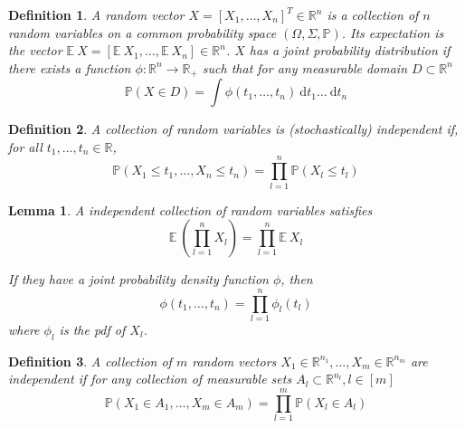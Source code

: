 \documentclass[10pt,a4paper]{article}
\theoremstyle{thmstyle}
\newtheorem{definition}{Definition}
\newtheorem{lemma}{Lemma}
\newcommand{\diff}{~\mathrm{d}}
\newcommand{\E}{\mathbb{E}~}
\renewcommand{\Pr}[1]{\mathbb{P}\left( #1 \right)}
\begin{document}
\begin{definition}
  A \emph{random vector} $X = [X_{1}, \dots, X_{n}]^{T} \in \mathbb{R}^{n}$ is a collection of $n$ random variables on a common probability space $(\Omega, \Sigma, \mathbb{P})$.
  Its expectation is the vector $\E X = [\E X_{1}, \dots, \E X_{n}] \in \mathbb{R}^{n}$.
  $X$ has a \emph{joint probability distribution} if there exists a function $\phi : \mathbb{R}^{n} \rightarrow \mathbb{R}_{+}$ such that for any measurable domain $D \subset \mathbb{R}^{n}$
  \begin{equation*}
    \Pr{X \in D} = \int \phi(t_{1}, \dots, t_{n}) \diff t_{1} \dots \diff t_{n}
  \end{equation*}
\end{definition}

\begin{definition}
  A collection of random variables is \emph{(stochastically) independent} if, for all $t_{1}, \dots, t_{n} \in \mathbb{R}$,
  \begin{equation*}
    \Pr{X_{1} \le t_{1}, \dots, X_{n} \le t_{n}} = \prod_{l = 1}^{n} \Pr{X_{l} \le t_{l}}
  \end{equation*}
\end{definition}

\begin{lemma}
  A independent collection of random variables satisfies
  \begin{equation*}
    \E \left( \prod_{l = 1}^{n} X_{l} \right) = \prod_{l = 1}^{n} \E X_{l}
  \end{equation*}

  If they have a joint probability density function $\phi$, then
  \begin{equation*}
    \phi(t_{1}, \dots, t_{n}) = \prod_{l = 1}^{n} \phi_{l}(t_{l})
  \end{equation*}
  where $\phi_{l}$ is the pdf of $X_{l}$.
\end{lemma}

\begin{definition}
  A collection of $m$ random vectors $X_{1} \in \mathbb{R}^{n_{1}}, \dots, X_{m} \in \mathbb{R}^{n_{m}}$ are independent if for any collection of measurable sets $A_{l} \subset \mathbb{R}^{n_{l}}, l \in [m]$
  \begin{equation*}
    \Pr{X_{1} \in A_{1}, \dots, X_{m} \in A_{m}} = \prod_{l = 1}^{m} \Pr{X_{l} \in A_{l}}
  \end{equation*}
\end{definition}
\end{document}
